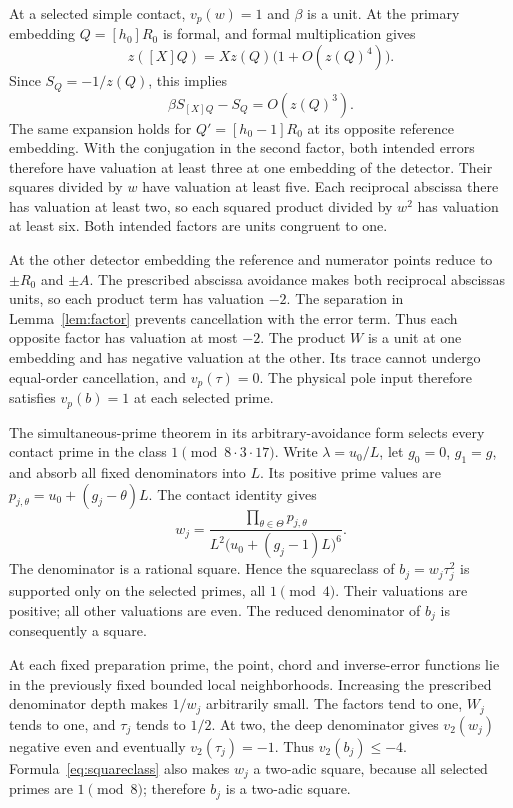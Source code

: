 \documentclass[11pt,a4paper]{article}
\begin{document}
At a selected simple contact, $v_p(w)=1$ and $\beta$ is a unit.
At the primary embedding $Q=[h_0]R_0$ is formal, and formal
multiplication gives
\[
             z([X]Q)=Xz(Q)\bigl(1+O(z(Q)^4)\bigr).
\]
Since $S_Q=-1/z(Q)$, this implies
\[
                        \beta S_{[X]Q}-S_Q=O(z(Q)^3).
\]
The same expansion holds for $Q'=[h_0-1]R_0$ at its opposite
reference embedding. With the conjugation in the second factor,
both intended errors therefore have valuation at least three
at one embedding of the detector. Their squares divided by $w$
have valuation at least five. Each reciprocal abscissa there has
valuation at least two, so each squared product divided by $w^2$
has valuation at least six. Both intended factors are units
congruent to one.

At the other detector embedding the reference and numerator
points reduce to $\pm R_0$ and $\pm A$. The prescribed abscissa
avoidance makes both reciprocal abscissas units, so each product
term has valuation $-2$. The separation in
Lemma~\ref{lem:factor} prevents cancellation with the error term.
Thus each opposite factor has valuation at most $-2$.
The product $W$ is a unit at one embedding and has negative
valuation at the other. Its trace cannot undergo equal-order
cancellation, and $v_p(\tau)=0$. The physical pole input therefore
satisfies $v_p(b)=1$ at each selected prime.

The simultaneous-prime theorem in its arbitrary-avoidance form
\cite{Primes} selects every contact prime in the class
$1\pmod{8\cdot3\cdot17}$. Write $\lambda=u_0/L$, let
$g_0=0$, $g_1=g$, and absorb all fixed denominators into $L$.
Its positive prime values are
$p_{j,\theta}=u_0+(g_j-\theta)L$. The contact identity gives
\begin{equation}\label{eq:squareclass}
 w_j=
 \frac{\prod_{\theta\in\Theta}p_{j,\theta}}
      {L^2\bigl(u_0+(g_j-1)L\bigr)^6}.
\end{equation}
The denominator is a rational square. Hence the squareclass of
$b_j=w_j\tau_j^2$ is supported only on the selected primes, all
$1\pmod4$. Their valuations are positive; all other valuations
are even. The reduced denominator of $b_j$ is consequently a square.

At each fixed preparation prime, the point, chord and inverse-error
functions lie in the previously fixed bounded local neighborhoods.
Increasing the prescribed denominator depth makes $1/w_j$
arbitrarily small. The factors tend to one, $W_j$ tends to one,
and $\tau_j$ tends to $1/2$. At two, the deep denominator gives
$v_2(w_j)$ negative even and eventually $v_2(\tau_j)=-1$.
Thus $v_2(b_j)\le-4$. Formula~\eqref{eq:squareclass} also makes
$w_j$ a two-adic square, because all selected primes are
$1\pmod8$; therefore $b_j$ is a two-adic square.
\end{document}
